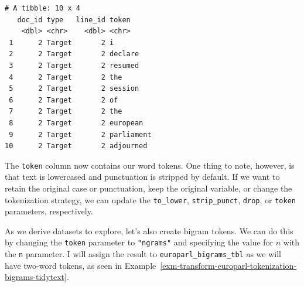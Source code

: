 \documentclass[
  letterpaper,
]{latex/krantz}
\theoremstyle{definition}
\theoremstyle{remark}
\begin{document}
\begin{verbatim}
# A tibble: 10 x 4
   doc_id type   line_id token     
    <dbl> <chr>    <dbl> <chr>     
 1      2 Target       2 i         
 2      2 Target       2 declare   
 3      2 Target       2 resumed   
 4      2 Target       2 the       
 5      2 Target       2 session   
 6      2 Target       2 of        
 7      2 Target       2 the       
 8      2 Target       2 european  
 9      2 Target       2 parliament
10      2 Target       2 adjourned 
\end{verbatim}

The \texttt{token} column now contains our word tokens. One thing to
note, however, is that text is lowercased and punctuation is stripped by
default. If we want to retain the original case or punctuation, keep the
original variable, or change the tokenization strategy, we can update
the \texttt{to\_lower}, \texttt{strip\_punct}, \texttt{drop}, or
\texttt{token} parameters, respectively.

As we derive datasets to explore, let's also create bigram tokens. We
can do this by changing the \texttt{token} parameter to
\texttt{"ngrams"} and specifying the value for \(n\) with the \texttt{n}
parameter. I will assign the result to \texttt{europarl\_bigrams\_tbl}
as we will have two-word tokens, as seen in
Example~\ref{exm-transform-europarl-tokenization-bigrams-tidytext}.
\end{document}
